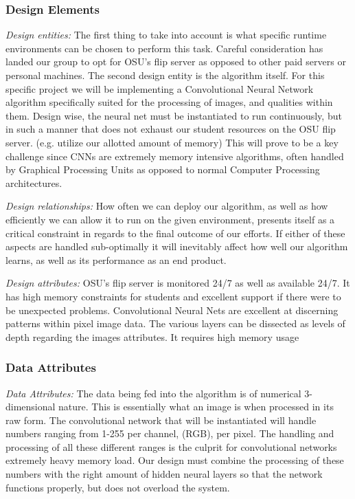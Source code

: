 \documentclass[onecolumn, draftclsnofoot,10pt, compsoc]{IEEEtran}
\begin{document}
\subsubsection{Design Elements}
\emph{Design entities:}
	The first thing to take into account is what specific runtime environments can be chosen to perform this task. Careful consideration has landed our group to opt for OSU’s flip server as opposed to other paid servers or personal machines. The second design entity is the algorithm itself. For this specific project we will be implementing a Convolutional Neural Network algorithm specifically suited for the processing of images, and qualities within them. Design wise, the neural net must be instantiated to run continuously, but in such a manner that does not exhaust our student resources on the OSU flip server. (e.g. utilize our allotted amount of memory) This will prove to be a key challenge since CNNs are extremely memory intensive algorithms, often handled by Graphical Processing Units as opposed to normal Computer Processing architectures. 

	\emph{Design relationships:}
	How often we can deploy our algorithm, as well as how efficiently we can allow it to run on the given environment, presents itself as a critical constraint in regards to the final outcome of our efforts. If either of these aspects are handled sub-optimally it will inevitably affect how well our algorithm learns, as well as its performance as an end product. 

	\emph{Design attributes:}
	OSU’s flip server is monitored 24/7 as well as available 24/7. It has high memory constraints for students and excellent support if there were to be unexpected problems. Convolutional Neural Nets are excellent at discerning patterns within pixel image data. The various layers can be dissected as levels of depth regarding the images attributes. It requires high memory usage

\subsubsection{Data Attributes}
\emph{Data Attributes:}
	The data being fed into the algorithm is of numerical 3-dimensional nature. This is essentially what an image is when processed in its raw form. The convolutional network that will be instantiated will handle numbers ranging from 1-255 per channel, (RGB), per pixel. The handling and processing of all these different ranges is the culprit for convolutional networks extremely heavy memory load. Our design must combine the processing of these numbers with the right amount of hidden neural layers so that the network functions properly, but does not overload the system.
\end{document}
